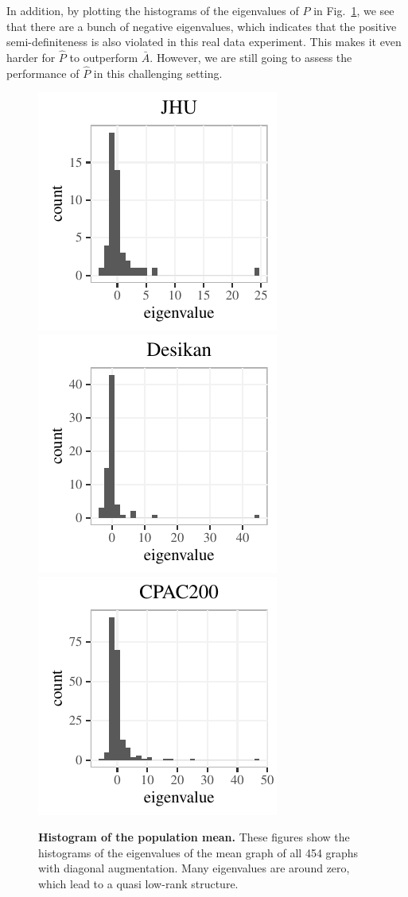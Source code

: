 \documentclass[10pt,letterpaper]{article}
\renewcommand{\hat}{\widehat}
\begin{document}
In addition, by plotting the histograms of the eigenvalues of $P$ in Fig.~\ref{fig:histogram}, we see that there are a bunch of negative eigenvalues, which indicates that the positive semi-definiteness is also violated in this real data experiment. This makes it even harder for $\hat{P}$ to outperform $\bar{A}$. However, we are still going to assess the performance of $\hat{P}$ in this challenging setting.

\begin{figure}[!htbp]
\centering
\includegraphics[height=.2\textheight]{hist_JHU.pdf} 
\includegraphics[height=.2\textheight]{hist_desikan.pdf} 
\includegraphics[height=.2\textheight]{hist_CPAC200.pdf}
\caption{{\bf Histogram of the population mean.}
These figures show the histograms of the eigenvalues of the mean graph of all 454 graphs with diagonal augmentation. Many eigenvalues are around zero, which lead to a quasi low-rank structure.
}
\label{fig:histogram}
\end{figure}
\end{document}
